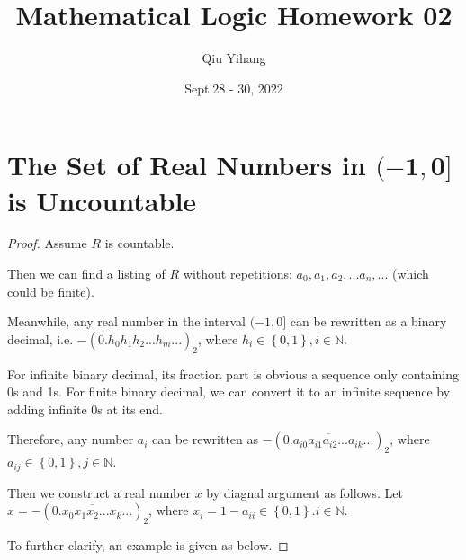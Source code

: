 \documentclass{article}
\title{\textbf{Mathematical Logic Homework 02}}
\author{Qiu Yihang}
\date{Sept.28 - 30, 2022}
\newcommand{\set}[1]{\left\{#1\right\}}
\begin{document}
\maketitle

\vspace{3em}
\section{The Set of Real Numbers in $\boldsymbol{(-1,0]}$ is Uncountable}
\vspace{1em}
\begin{proof}
    Assume $R$ is countable. 
    
    \hspace{1.3em}
    Then we can find a listing of $R$ without repetitions: $a_0, a_1, a_2, ... a_n, ...$ (which could be finite).

    \hspace{1.3em}
    Meanwhile, any real number in the interval $(-1,0]$ can be rewritten as a binary decimal, i.e. $-\left(\overline{0.h_0h_1h_2...h_m...}\right)_2$, where $h_i\in\set{0,1}, i\in\mathbb{N}$.
    
    \hspace{1.3em}
    For infinite binary decimal, its fraction part is obvious a sequence only containing 0s and 1s. For finite binary decimal, we can convert it to an infinite sequence by adding infinite 0s at its end.

    \hspace{1.3em}
    Therefore, any number $a_i$ can be rewritten as $-\left(\overline{0.a_{i0}a_{i1}a_{i2}...a_{ik}...}\right)_2$, where $a_{ij}\in\set{0,1}, j\in\mathbb{N}$.

    \vspace{1em} \hspace{1.3em}
    Then we construct a real number $x$ by diagnal argument as follows. Let $x=-\left(\overline{0.x_0x_1x_2...x_k...}\right)_2$, where $x_i = 1-a_{ii}\in\set{0,1}. i\in\mathbb{N}.$

    \hspace{1.3em}
    To further clarify, an example is given as below.


\end{proof}
\end{document}
